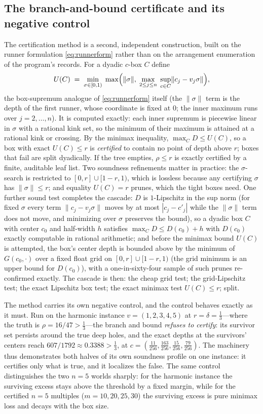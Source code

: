 \documentclass[11pt,a4paper]{article}
\numberwithin{equation}{section}
\theoremstyle{plain}
\theoremstyle{definition}
\theoremstyle{remark}
\newcommand{\wnc}[1]{\lVert #1 \rVert}
\begin{document}
\subsection{The branch-and-bound certificate and its negative control}
\label{sec:bb}

The certification method is a second, independent construction, built on
the runner formulation \eqref{eq:runnerform} rather than on the
arrangement enumeration of the program's records. For a dyadic $c$-box
$C$ define
\[
U(C)\;=\;\min_{\sigma\in[0,1)}\;
\max\Bigl(\wnc{\sigma},\;\max_{2\le j\le n}\;
\sup_{c\in C}\wnc{c_j-v_j\sigma}\Bigr),
\]
the box-supremum analogue of \eqref{eq:runnerform} itself (the
$\wnc\sigma$ term is the depth of the first runner, whose coordinate is
fixed at $0$; the inner maximum runs over $j=2,\dots,n$). It is
computed exactly: each inner supremum is piecewise linear in $\sigma$
with a rational kink set, so the minimum of their maximum is attained at
a rational kink or crossing. By the minimax inequality,
$\max_C D\le U(C)$, so a box with exact $U(C)\le r$ is \emph{certified}
to contain no point of depth above $r$; boxes that fail are split
dyadically. If the tree empties, $\rho\le r$ is exactly certified by a
finite, auditable leaf list. Two soundness refinements matter in
practice: the $\sigma$-search is restricted to $[0,r]\cup[1-r,1)$, which
is lossless because any certifying $\sigma$ has $\wnc\sigma\le r$; and
equality $U(C)=r$ prunes, which the tight boxes need. One further
sound test completes the cascade: $D$ is $1$-Lipschitz in the sup norm
(for fixed $\sigma$ every term $\wnc{c_j-v_j\sigma}$ moves by at most
$|c_j-c'_j|$ while the $\wnc\sigma$ term does not move, and minimizing
over $\sigma$ preserves the bound), so a dyadic box $C$ with center
$c_0$ and half-width $h$ satisfies $\max_C D\le D(c_0)+h$ with $D(c_0)$
exactly computable in rational arithmetic; and before the minimax bound
$U(C)$ is attempted, the box's center depth is bounded above by the
minimum of $G(c_0,\cdot)$ over a fixed float grid on
$[0,r]\cup[1-r,1)$ (the grid minimum is an upper bound for $D(c_0)$),
with a one-in-sixty-four sample of such prunes re-confirmed exactly.
The cascade is then: the cheap grid test; the grid-Lipschitz test; the
exact Lipschitz box test; the exact minimax test $U(C)\le r$; split.

The method carries its own negative control, and the control behaves
exactly as it must. Run on the harmonic instance $v=(1,2,3,4,5)$ at
$r=\delta=\tfrac13$---where the truth is $\rho=16/47>\tfrac13$---the
branch and bound \emph{refuses to certify}: its survivor set persists
around the true deep holes, and the exact depths at the survivors'
centers reach $607/1792\approx0.3388>\tfrac13$, at
$c=(\tfrac{11}{256},\tfrac{163}{256},\tfrac{15}{256},\tfrac{79}{256})$.
The machinery thus demonstrates both halves of its own soundness profile
on one instance: it certifies only what is true, and it localizes the
false. The same control distinguishes the two $n=5$ worlds sharply: for
the harmonic instance the surviving excess stays above the threshold by
a fixed margin, while for the certified $n=5$ multiples
($m=10,20,25,30$) the surviving excess is pure minimax loss and decays
with the box size.
\end{document}
